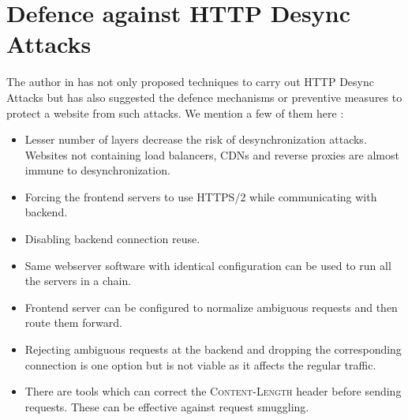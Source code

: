 \chapter{Defence against HTTP Desync Attacks}
The author in \cite{b6} has not only proposed techniques to carry out HTTP Desync Attacks but has also suggested the defence mechanisms or preventive measures to protect a website from such attacks. We mention a few of them here :
\begin{itemize}
	\item Lesser number of layers decrease the risk of desynchronization attacks. Websites not containing load balancers, CDNs and reverse proxies are almost immune to desynchronization. 
	\item Forcing the frontend servers to use HTTPS/2 \cite{b15} while communicating with backend. 
	\item Disabling backend connection reuse.
	\item Same webserver software with identical configuration can be used to run all the servers in a chain. 
	\item Frontend server can be configured to normalize ambiguous requests and then route them forward. 
	\item Rejecting ambiguous requests at the backend and dropping the corresponding connection is one option but is not viable as it affects the regular traffic. 
	\item There are tools which can correct the \textsc{Content-Length} header before sending requests. These can be effective against request smuggling. 
\end{itemize}

